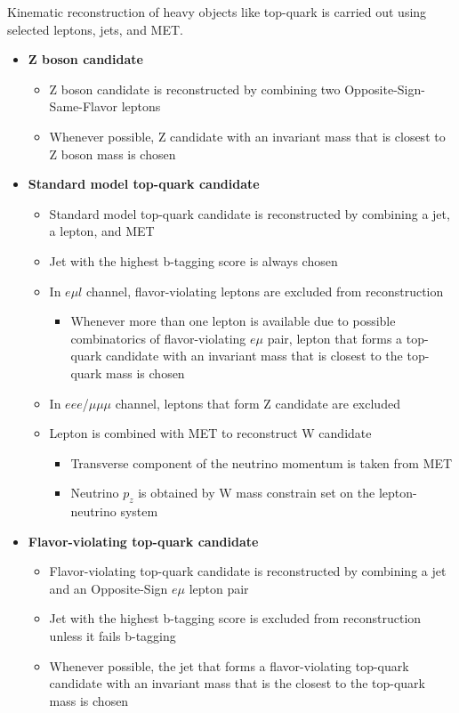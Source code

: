 Kinematic reconstruction of heavy objects like top-quark is carried out using selected leptons, jets, and MET.
\begin{itemize}
\item \textbf{Z boson candidate}
\begin{itemize}
\item Z boson candidate is reconstructed by combining two Opposite-Sign-Same-Flavor leptons 
\item Whenever possible, Z candidate with an invariant mass that is closest to Z boson mass is chosen
\end{itemize}
\item \textbf{Standard model top-quark candidate }
\begin{itemize}
\item Standard model top-quark candidate is reconstructed by combining a jet, a lepton, and MET
\item Jet with the highest b-tagging score is always chosen
\item In $e\mu l$ channel, flavor-violating leptons are excluded from reconstruction 
\begin{itemize}
\item Whenever more than one lepton is available due to possible combinatorics of flavor-violating $e\mu$ pair, lepton that forms a top-quark candidate with an invariant mass that is closest to the top-quark mass is chosen 
\end{itemize}
\item In $eee$/$\mu\mu\mu$ channel, leptons that form Z candidate are excluded 
\item Lepton is combined with MET to reconstruct W candidate 
\begin{itemize}
\item Transverse component of the neutrino momentum is taken from MET
\item Neutrino $p_z$ is obtained by W mass constrain set on the lepton-neutrino system 
\end{itemize}
\end{itemize}
\item \textbf{Flavor-violating top-quark candidate }
\begin{itemize}
\item Flavor-violating top-quark candidate is reconstructed by combining a jet and an Opposite-Sign $e\mu$ lepton pair
\item Jet with the highest b-tagging score is excluded from reconstruction unless it fails b-tagging 
\item Whenever possible, the jet that forms a flavor-violating top-quark candidate with an invariant mass that is the closest to the top-quark mass is chosen

\end{itemize}
\end{itemize}
